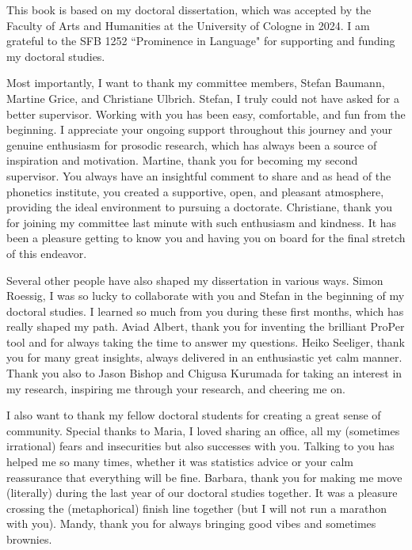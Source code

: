 \addchap{\lsAcknowledgementTitle} 

This book is based on my doctoral dissertation, which was accepted by the Faculty of Arts and Humanities at the University of Cologne in 2024. I am grateful to the SFB 1252 ``Prominence in Language" for supporting and funding my doctoral studies. 

Most importantly, I want to thank my committee members, Stefan Baumann, Martine Grice, and Christiane Ulbrich. Stefan, I truly could not have asked for a better supervisor. Working with you has been easy, comfortable, and fun from the beginning. I appreciate your ongoing support throughout this journey and your genuine enthusiasm for prosodic research, which has always been a source of inspiration and motivation. Martine, thank you for becoming my second supervisor. You always have an insightful comment to share and as head of the phonetics institute, you created a supportive, open, and pleasant atmosphere, providing the ideal environment to pursuing a doctorate. Christiane, thank you for joining my committee last minute with such enthusiasm and kindness. It has been a pleasure getting to know you and having you on board for the final stretch of this endeavor.

Several other people have also shaped my dissertation in various ways. Simon Roessig, I was so lucky to collaborate with you and Stefan in the beginning of my doctoral studies. I learned so much from you during these first months, which has really shaped my path. Aviad Albert, thank you for inventing the brilliant ProPer tool and for always taking the time to answer my questions. Heiko Seeliger, thank you for many great insights, always delivered in an enthusiastic yet calm manner. Thank you also to Jason Bishop and Chigusa Kurumada for taking an interest in my research, inspiring me through your research, and cheering me on.

\largerpage
I also want to thank my fellow doctoral students for creating a great sense of community. Special thanks to Maria, I loved sharing an office, all my (sometimes irrational) fears and insecurities but also successes with you. Talking to you has helped me so many times, whether it was statistics advice or your calm reassurance that everything will be fine. Barbara, thank you for making me move (literally) during the last year of our doctoral studies together. It was a pleasure crossing the (metaphorical) finish line together (but I will not run a marathon with you). Mandy, thank you for always bringing good vibes and sometimes brownies.

